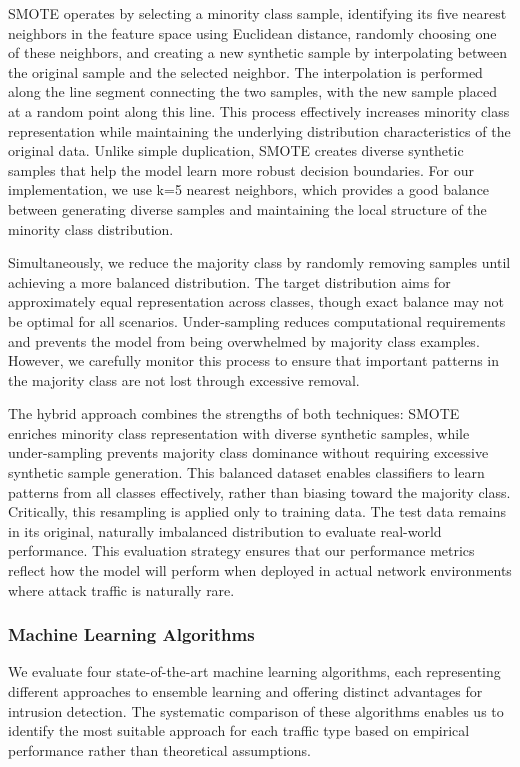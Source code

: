 \documentclass[conference]{IEEEtran}
\begin{document}
SMOTE operates by selecting a minority class sample, identifying its five nearest neighbors in the feature space using Euclidean distance, randomly choosing one of these neighbors, and creating a new synthetic sample by interpolating between the original sample and the selected neighbor. The interpolation is performed along the line segment connecting the two samples, with the new sample placed at a random point along this line. This process effectively increases minority class representation while maintaining the underlying distribution characteristics of the original data. Unlike simple duplication, SMOTE creates diverse synthetic samples that help the model learn more robust decision boundaries. For our implementation, we use k=5 nearest neighbors, which provides a good balance between generating diverse samples and maintaining the local structure of the minority class distribution.

Simultaneously, we reduce the majority class by randomly removing samples until achieving a more balanced distribution. The target distribution aims for approximately equal representation across classes, though exact balance may not be optimal for all scenarios. Under-sampling reduces computational requirements and prevents the model from being overwhelmed by majority class examples. However, we carefully monitor this process to ensure that important patterns in the majority class are not lost through excessive removal.

The hybrid approach combines the strengths of both techniques: SMOTE enriches minority class representation with diverse synthetic samples, while under-sampling prevents majority class dominance without requiring excessive synthetic sample generation. This balanced dataset enables classifiers to learn patterns from all classes effectively, rather than biasing toward the majority class. Critically, this resampling is applied only to training data. The test data remains in its original, naturally imbalanced distribution to evaluate real-world performance. This evaluation strategy ensures that our performance metrics reflect how the model will perform when deployed in actual network environments where attack traffic is naturally rare.


\subsubsection{Machine Learning Algorithms}

We evaluate four state-of-the-art machine learning algorithms, each representing different approaches to ensemble learning and offering distinct advantages for intrusion detection. The systematic comparison of these algorithms enables us to identify the most suitable approach for each traffic type based on empirical performance rather than theoretical assumptions.
\end{document}
